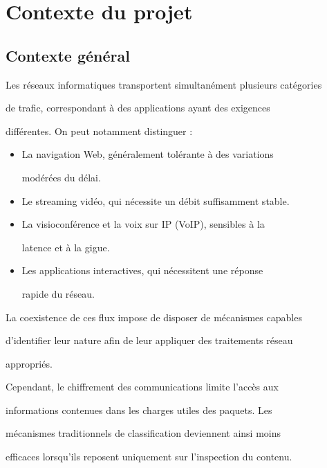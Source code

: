 \section{Contexte du projet}



\subsection{Contexte général}



Les réseaux informatiques transportent simultanément plusieurs catégories

de trafic, correspondant à des applications ayant des exigences

différentes. On peut notamment distinguer :



\begin{itemize}

    \item La navigation Web, généralement tolérante à des variations

    modérées du délai.

    \item Le streaming vidéo, qui nécessite un débit suffisamment stable.

    \item La visioconférence et la voix sur IP (VoIP), sensibles à la

    latence et à la gigue.

    \item Les applications interactives, qui nécessitent une réponse

    rapide du réseau.

\end{itemize}



La coexistence de ces flux impose de disposer de mécanismes capables

d'identifier leur nature afin de leur appliquer des traitements réseau

appropriés.



Cependant, le chiffrement des communications limite l'accès aux

informations contenues dans les charges utiles des paquets. Les

mécanismes traditionnels de classification deviennent ainsi moins

efficaces lorsqu'ils reposent uniquement sur l'inspection du contenu.



